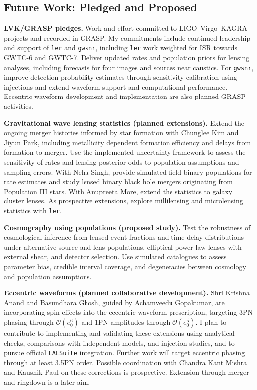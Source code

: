 \documentclass[margin,line]{res}
\begin{document}
\begin{resume}
\section{\sc Future Work: Pledged and Proposed}

\textbf{LVK/GRASP pledges.} Work and effort committed to LIGO--Virgo--KAGRA projects and recorded in GRASP. My commitments include continued leadership and support of \texttt{ler} and \texttt{gwsnr}, including \texttt{ler} work weighted for ISR towards GWTC-6 and GWTC-7. Deliver updated rates and population priors for lensing analyses, including forecasts for four images and sources near caustics. For \texttt{gwsnr}, improve detection probability estimates through sensitivity calibration using injections and extend waveform support and computational performance. Eccentric waveform development and implementation are also planned GRASP activities.

\textbf{Gravitational wave lensing statistics (planned extensions).} Extend the ongoing merger histories informed by star formation with Chunglee Kim and Jiyun Park, including metallicity dependent formation efficiency and delays from formation to merger. Use the implemented uncertainty framework to assess the sensitivity of rates and lensing posterior odds to population assumptions and sampling errors. With Neha Singh, provide simulated field binary populations for rate estimates and study lensed binary black hole mergers originating from Population III stars. With Anupreeta More, extend the statistics to galaxy cluster lenses. As prospective extensions, explore millilensing and microlensing statistics with \texttt{ler}.

\textbf{Cosmography using populations (proposed study).} Test the robustness of cosmological inference from lensed event fractions and time delay distributions under alternative source and lens populations, elliptical power law lenses with external shear, and detector selection. Use simulated catalogues to assess parameter bias, credible interval coverage, and degeneracies between cosmology and population assumptions.

\textbf{Eccentric waveforms (planned collaborative development).} Shri Krishna Anand and Basundhara Ghosh, guided by Achamveedu Gopakumar, are incorporating spin effects into the eccentric waveform prescription, targeting 3PN phasing through $\mathcal{O}(e_0^6)$ and 1PN amplitudes through $\mathcal{O}(e_0^5)$. I plan to contribute to implementing and validating these extensions using analytical checks, comparisons with independent models, and injection studies, and to pursue official \texttt{LALSuite} integration. Further work will target eccentric phasing through at least 3.5PN order. Possible coordination with Chandra Kant Mishra and Kaushik Paul on these corrections is prospective. Extension through merger and ringdown is a later aim.


\end{resume}
\end{document}

